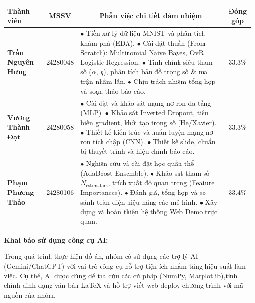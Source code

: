 \documentclass[11pt,a4paper]{article}
\begin{document}
\begin{table}[H]
\centering
\renewcommand{\arraystretch}{1.4} %
\small
\begin{tabularx}{\textwidth}{|l|c|X|c|}
\hline
\textbf{Thành viên} & \textbf{MSSV} & \multicolumn{1}{c|}{\textbf{Phần việc chi tiết đảm nhiệm}} & \textbf{Đóng góp} \\
\hline
\textbf{Trần Nguyên Hưng} & 24280048 & 
$\bullet$ Tiền xử lý dữ liệu MNIST và phân tích khám phá (EDA). \newline
$\bullet$ Cài đặt thuần (From Scratch): Multinomial Naive Bayes, OvR Logistic Regression. \newline
$\bullet$ Tinh chỉnh siêu tham số ($\alpha$, $\eta$), phân tích bản đồ trọng số \& ma trận nhầm lẫn. \newline
$\bullet$ Chịu trách nhiệm tổng hợp và soạn thảo báo cáo. & 
33.3\% \\
\hline
\textbf{Vương Thành Đạt} & 24280058 & 
$\bullet$ Cài đặt và khảo sát mạng nơ-ron đa tầng (MLP). \newline
$\bullet$ Khảo sát Inverted Dropout, tiêu biến gradient, khởi tạo trọng số (He/Xavier). \newline
$\bullet$ Thiết kế kiến trúc và huấn luyện mạng nơ-ron tích chập (CNN). \newline
$\bullet$ Thiết kế slide, chuẩn bị thuyết trình và hiệu chỉnh báo cáo. & 
33.3\% \\
\hline
\textbf{Phạm Phương Thảo} & 24280106 & 
$\bullet$ Nghiên cứu và cài đặt học quần thể (AdaBoost Ensemble). \newline
$\bullet$ Khảo sát tham số $N_{\text{estimators}}$, trích xuất độ quan trọng (Feature Importances). \newline
$\bullet$ Đánh giá, tổng hợp và so sánh toàn diện hiệu năng các mô hình. \newline
$\bullet$ Xây dựng và hoàn thiện hệ thống Web Demo trực quan. & 
33.4\% \\
\hline
\end{tabularx}
\end{table}

\noindent
\textbf{Khai báo sử dụng công cụ AI:} 

Trong quá trình thực hiện đồ án, nhóm có sử dụng các trợ lý AI (Gemini/ChatGPT) với vai trò công cụ hỗ trợ tiện ích nhằm tăng hiệu suất làm việc. Cụ thể, AI được dùng để tra cứu các cú pháp (NumPy, Matplotlib),tinh chỉnh định dạng văn bản LaTeX và hỗ trợ viết web deploy chương trình với mã nguồn của nhóm. 
\end{document}
